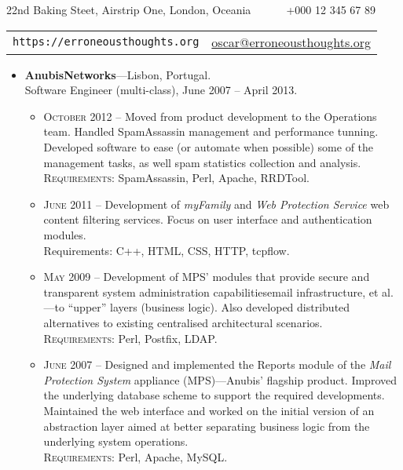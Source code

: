 \documentclass[a4paper,9pt]{extarticle}
\newenvironment{topic}[1]
   {{\noindent\large\bfseries\raisebox{0pt}[\height][1ex]{#1}\hrule}%
    \begin{list}{}{%
       \setlength{\leftmargin}{.0cm}}%
    \item[]}
   {\end{list}\medskip}
\newenvironment{header}[1]
   {\centering{\noindent\large\bfseries\raisebox{0pt}[\height][1ex]{\LARGE\bfseries #1}\hrule}%
    \begin{center}}
   {\end{center}\medskip}
\begin{document}
\begin{header}
  {Óscar Francisco Godinho Pereira} 
  { 22nd Baking Steet, Airstrip One, London, Oceania \verb+     + \Telefon +000 12 345 67 89 }\\[5pt]
  \begin{tabular}{l|r}
    \texttt{https://erroneousthoughts.org} & \url{oscar@erroneousthoughts.org} 
  \end{tabular}
\end{header}

\begin{topic}{Professional Experience}
  \begin{itemize}[leftmargin=*]
    \item {\bfseries AnubisNetworks}---Lisbon, Portugal.\\
      Software Engineer (multi-class), June 2007 -- April 2013.
      \begin{itemize}
	\item {\scshape October 2012} -- Moved from product development to the Operations team. Handled 
	  SpamAssassin management and performance tunning. Developed software to 
	  ease (or automate when possible) some of the management tasks, as well spam 
	  statistics collection and analysis.\\
	  {\scshape Requirements}: SpamAssassin, Perl, Apache, RRDTool.
	\item {\scshape June 2011} -- Development of \emph{myFamily} and \emph{Web Protection Service} 
	  web content filtering services. Focus on user interface and authentication modules.\\
	  {Requirements}: C++, HTML, CSS, HTTP, tcpflow.
	\item {\scshape May 2009} -- Development of MPS' modules that provide secure and transparent 
	  system administration capabilities\textemdash email infrastructure, et al.---to 
	  ``upper'' layers (business logic). Also developed distributed 
	  alternatives to existing centralised architectural scenarios.\\
	  {\scshape Requirements}: Perl, Postfix, LDAP.
	\item {\scshape June 2007} -- Designed and implemented the Reports module of the \emph{Mail 
	  Protection System}\textsuperscript{\texttrademark} appliance 
	  (MPS)---Anubis' flagship product. Improved the underlying database 
	  scheme to support the required developments. Maintained the web 
	  interface and worked on the initial version of an abstraction layer 
	  aimed at better separating business logic from the underlying system 
	  operations.\\
	  {\scshape Requirements}: Perl, Apache, MySQL.
      \end{itemize}
  \end{itemize}
\end{topic}
\end{document}
